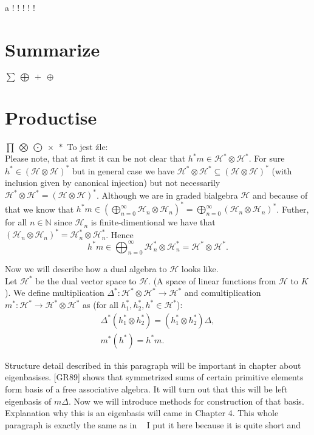 \documentclass[a4paper]{article}
\begin{document}
a ! \large! \Large! \huge! \Huge! \normalsize

\section{Summarize}
$\displaystyle\sum\ \bigoplus\ +\ \oplus$

\section{Productise}
$\displaystyle\prod\ \bigotimes\ \bigodot\ \times\ *$
\hfill \break
To jest źle: \\
Please note, that at first it can be not clear that $h^*m \in \mathcal{H}^* \otimes \mathcal{H}^*$.
For sure $h^* \in (\mathcal{H} \otimes \mathcal{H})^*$ but in general case we have
$ \mathcal{H}^* \otimes \mathcal{H}^* \subseteq (\mathcal{H} \otimes \mathcal{H})^*$ (with inclusion given by
canonical injection) but not necessarily
$ \mathcal{H}^* \otimes \mathcal{H}^* = (\mathcal{H} \otimes \mathcal{H})^*$.
Although we are in graded bialgebra $\mathcal{H}$ and because of that we know that
$h^*m \in \displaystyle\left(\bigoplus^\infty_{n=0}\mathcal{H}_n \otimes \mathcal{H}_n\right)^* =
\displaystyle\bigoplus^\infty_{n = 0} (\mathcal{H}_n \otimes \mathcal{H}_n)^*$. Futher, for all
$n \in \mathbb{N}$ since $\mathcal{H}_n$ is finite-dimentional we have that
$(\mathcal{H}_n \otimes \mathcal{H}_n)^* = \mathcal{H}_n^* \otimes \mathcal{H}_n^*$.
Hence
\begin{equation*}
h^*m \in \displaystyle\bigoplus^\infty_{n = 0} \mathcal{H}_n^* \otimes \mathcal{H}^*_n =
\mathcal{H}^* \otimes \mathcal{H}^*.
\end{equation*}

Now we will describe how a dual algebra to $\mathcal{H}$ looks like. \\
Let $\mathcal{H}^*$ be the dual vector space to $\mathcal{H}$. (A space of linear functions from
$\mathcal{H}$ to $K$). We define multiplication
$\Delta^* : \mathcal{H}^* \otimes \mathcal{H}^* \to \mathcal{H}^*$ and comultiplication
$m^* : \mathcal{H}^* \to \mathcal{H}^* \otimes \mathcal{H}^*$ as
(for all $h_1^*, h_2^*, h^* \in \mathcal{H}^*$):
\begin{align*}
\Delta^*(h_1^* \otimes h_2^*) = (h_1^* \otimes h_2^*)\Delta, \\
m^*(h^*) = h^*m.
\end{align*}

Structure detail described in this paragraph will be important in chapter about eigenbasises.
[GR89] shows that symmetrized sums of certain primitive elements form basis of a free associative algebra.
It will turn out that this will be left eigenbasis of $m\Delta$. Now we will introduce methods for
construction of that basis. Explanation why this is an eigenbasis will came in Chapter 4. This whole
paragraph is exactly the same as in ~\cite{Diaconis2014} I put it here because it is quite short and \\
\end{document}
